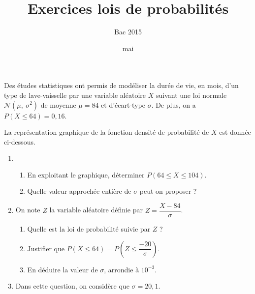 \documentclass[12pt,french]{article}
\title{Exercices lois de probabilités}
\date{mai \the\year}
\author{Bac 2015}
\begin{document}
\maketitle

\begin{question}[subtitle={Pondichery 2015}]
Des études statistiques ont permis de modéliser la durée de vie, en mois,
d'un type de lave-vaisselle par une variable aléatoire $X$ suivant une loi
normale $\mathcal{N}\left(\mu,~ \sigma^2\right)$ de moyenne $\mu = 84$ et
d'écart-type $\sigma$. De plus, on a $P(X \leqslant 64) = 0,16$.

La représentation graphique de la fonction densité de probabilité de $X$ est
donnée ci-dessous.

\begin{center}
\end{center}

\begin{enumerate}
  \item 
    \begin{enumerate}
      \item En exploitant le graphique, déterminer $P(64 \leqslant X
        \leqslant 104)$.
      \item Quelle valeur approchée entière de $\sigma$ peut-on proposer ?
    \end{enumerate}
  \item On note $Z$ la variable aléatoire définie par $Z = \dfrac{X -
    84}{\sigma}$.
    \begin{enumerate}
      \item Quelle est la loi de probabilité suivie par $Z$ ?
      \item Justifier que $P(X \leqslant 64) = P \left(Z \leqslant \dfrac{-
        20}{\sigma}\right)$.
      \item En déduire la valeur de $\sigma$, arrondie à $10^{-3}$.
    \end{enumerate}
  \item Dans cette question, on considère que $\sigma = 20,1$.


\end{enumerate}
\end{question}
\end{document}
